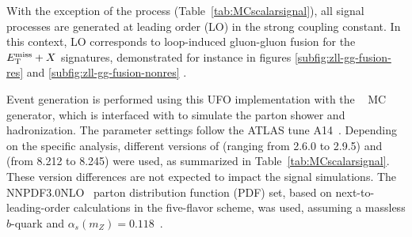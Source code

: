 \begin{table}[h!]
\centering
{}
\caption{Details of the \MGNLO generation set-up used for the \thdma signal samples, for the signatures considered in this publication.
The \texttt{Pseudoscalar\_2HDM} UFO model is used for all simulated samples except those for the \htb search, which relies on the UFO of reference~\cite{Degrande:2015vpa}.
The \hinv\ and \hlrs signatures are not listed here as no signal samples are required for the re-interpretation, which in those cases relies on the branching ratio limits \cite{2hdma_comb}.}
\label{tab:MCscalarsignal}
\end{table}

With the exception of the \htb process (Table~\ref{tab:MCscalarsignal}), all signal processes are generated at leading order (LO) in the strong coupling constant. In this context, LO corresponds to loop-induced gluon-gluon fusion for the $E_{\mathrm{T}}^{\mathrm{miss}}+X$ signatures, demonstrated for instance in figures \ref{subfig:zll-gg-fusion-res} and \ref{subfig:zll-gg-fusion-nonres} \cite{2hdma_comb}.

Event generation is performed using this UFO implementation with the \MGNLO~\cite{Alwall:2014hca} MC generator, which is interfaced with \cite{Sjostrand:2014zea} to simulate the parton shower and hadronization. The parameter settings follow the ATLAS tune A14~\cite{ATL-PHYS-PUB-2014-021}. Depending on the specific analysis, different versions of \MGNLO (ranging from 2.6.0 to 2.9.5) and \PYTHIA (from 8.212 to 8.245) were used, as summarized in Table~\ref{tab:MCscalarsignal}. These version differences are not expected to impact the signal simulations. The NNPDF3.0NLO~\cite{Ball:2014uwa} parton distribution function (PDF) set, based on next-to-leading-order calculations in the five-flavor scheme, was used, assuming a massless $b$-quark and $\alpha_{s}(m_{Z}) = 0.118$~\cite{Ball:2014uwa}.

